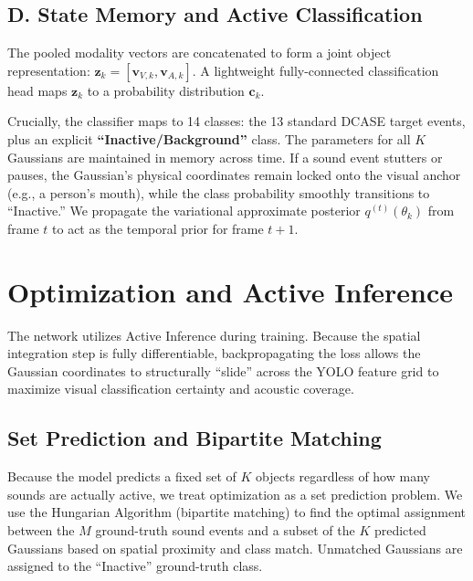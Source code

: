 \documentclass{article}
\begin{document}
\subsection{D. State Memory and Active Classification}
The pooled modality vectors are concatenated to form a joint object representation: $\mathbf{z}_k = [\mathbf{v}_{V,k}, \mathbf{v}_{A,k}]$. A lightweight fully-connected classification head maps $\mathbf{z}_k$ to a probability distribution $\mathbf{c}_k$. 

Crucially, the classifier maps to 14 classes: the 13 standard DCASE target events, plus an explicit \textbf{``Inactive/Background''} class. The parameters for all $K$ Gaussians are maintained in memory across time. If a sound event stutters or pauses, the Gaussian's physical coordinates remain locked onto the visual anchor (e.g., a person's mouth), while the class probability smoothly transitions to ``Inactive.'' We propagate the variational approximate posterior $q^{(t)}(\theta_k)$ from frame $t$ to act as the temporal prior for frame $t+1$.

\section{Optimization and Active Inference}

The network utilizes Active Inference during training. Because the spatial integration step is fully differentiable, backpropagating the loss allows the Gaussian coordinates to structurally ``slide'' across the YOLO feature grid to maximize visual classification certainty and acoustic coverage.

\subsection{Set Prediction and Bipartite Matching}
Because the model predicts a fixed set of $K$ objects regardless of how many sounds are actually active, we treat optimization as a set prediction problem. We use the Hungarian Algorithm (bipartite matching) to find the optimal assignment between the $M$ ground-truth sound events and a subset of the $K$ predicted Gaussians based on spatial proximity and class match. Unmatched Gaussians are assigned to the ``Inactive'' ground-truth class.
\end{document}
